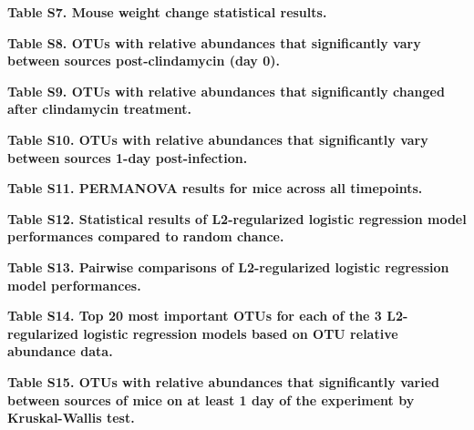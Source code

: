 \documentclass[
  11pt,
]{article}
\begin{document}
\textbf{Table S7. Mouse weight change statistical results.}

\textbf{Table S8. OTUs with relative abundances that significantly vary
between sources post-clindamycin (day 0).}

\textbf{Table S9. OTUs with relative abundances that significantly
changed after clindamycin treatment.}

\textbf{Table S10. OTUs with relative abundances that significantly vary
between sources 1-day post-infection.}

\textbf{Table S11. PERMANOVA results for mice across all timepoints.}

\textbf{Table S12. Statistical results of L2-regularized logistic
regression model performances compared to random chance.}

\textbf{Table S13. Pairwise comparisons of L2-regularized logistic
regression model performances.}

\textbf{Table S14. Top 20 most important OTUs for each of the 3
L2-regularized logistic regression models based on OTU relative
abundance data.}

\textbf{Table S15. OTUs with relative abundances that significantly
varied between sources of mice on at least 1 day of the experiment by
Kruskal-Wallis test.}
\end{document}
